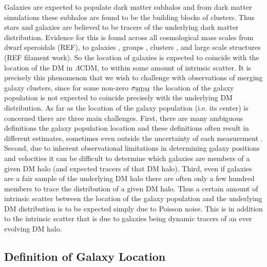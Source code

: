 Galaxies are expected to populate dark matter subhalos \citep[e.g.][]{Yang:2012gg} and from dark matter simulations these subhalos are found to be the building blocks of clusters.
Thus stars and galaxies are believed to be tracers of the underlying dark matter distribution.
Evidence for this is found across all cosmological mass scales from dwarf speroidals (REF), to galaxies \citep[e.g.][]{Choi:2011wv, Choi:2012uo}, groups \citep[e.g.][]{George:2012uo}, clusters \citep[e.g.][]{Dahle:2000uz}, and large scale structures (REF filament work).
So the location of galaxies is expected to coincide with the location of the DM in $\Lambda$CDM, to within some amount of intrinsic scatter.
It is precisely this phenomenon that we wish to challenge with observations of merging galaxy clusters, since for some non-zero $\sigma_{\rm SIDM}$ the location of the galaxy population is not expected to coincide precisely with the underlying DM distribution.
As far as the location of the galaxy population (i.e. its center) is concerned there are three main challenges.
First, there are many ambiguous definitions the galaxy population location and these definitions often result in different estimates, sometimes even outside the uncertainty of each measurement \citep{George:2012uo}.
Second, due to inherent observational limitations in determining galaxy positions and velocities it can be difficult to determine which galaxies are members of a given DM halo (and expected tracers of that DM halo).
Third, even if galaxies are a fair sample of the underlying DM halo there are often only a few hundred members to trace the distribution of a given DM halo.
Thus a certain amount of intrinsic scatter between the location of the galaxy population and the underlying DM distribution is to be expected simply due to Poisson noise.
This is in addition to the intrinsic scatter that is due to galaxies being dynamic tracers of an ever evolving DM halo. 

\subsection{Definition of Galaxy Location}

